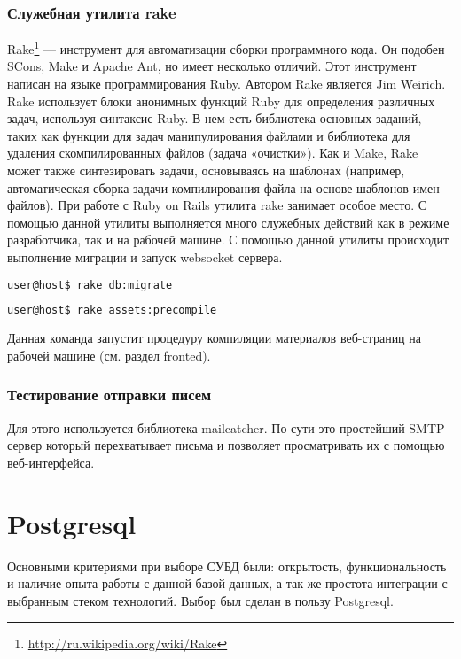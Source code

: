 \subsubsection{Служебная утилита rake}
Rake\footnote{
	\url{http://ru.wikipedia.org/wiki/Rake}
} — инструмент для автоматизации сборки программного кода. Он подобен
SCons, Make и Apache Ant, но имеет несколько отличий. Этот инструмент написан на языке
программирования Ruby. Автором Rake является Jim Weirich.
Rake использует блоки анонимных функций Ruby для определения различных задач,
используя синтаксис Ruby. В нем есть библиотека основных заданий, таких как
функции для задач манипулирования файлами и библиотека для удаления
скомпилированных файлов (задача «очистки»). Как и Make, Rake может также
синтезировать задачи, основываясь на шаблонах (например, автоматическая сборка
задачи компилирования файла на основе шаблонов имен файлов).
При работе с Ruby on Rails утилита rake занимает особое место. С помощью данной
утилиты выполняется много служебных действий как в режиме разработчика, так и на
рабочей машине. С помощью данной утилиты происходит выполнение миграции и запуск
websocket сервера.

\begin{lstlisting}[language=Bash,caption=Выполнение миграций
,label={lst:rails_new_application}] 
user@host$ rake db:migrate
\end{lstlisting}

\begin{lstlisting}[language=Bash,caption=Компиляция ресурсов
,label={lst:rails_new_application}] 
user@host$ rake assets:precompile
\end{lstlisting}
 
 Данная команда запустит процедуру компиляции материалов веб-страниц на рабочей
 машине (см. раздел fronted).
 
 \subsubsection{Тестирование отправки писем}
 Для этого используется библиотека mailcatcher. По сути это простейший
 SMTP-сервер который перехватывает письма и позволяет просматривать их с помощью
 веб-интерфейса.
 
 \section{Postgresql}
Основными критериями при выборе СУБД были: открытость, функциональность и
наличие опыта работы с данной базой данных, а так же простота интеграции с
выбранным стеком технологий. Выбор был сделан в пользу Postgresql.

